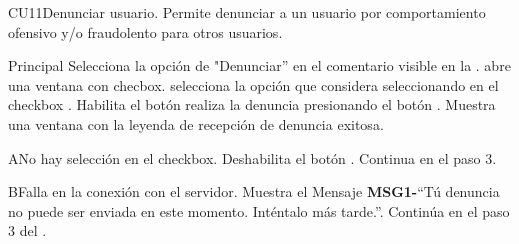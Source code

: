 \begin{UseCase}{CU11}{Denunciar usuario.}{
		Permite denunciar a un usuario por comportamiento ofensivo y/o fraudolento para otros usuarios.
	}
		
	\end{UseCase}

	\begin{UCtrayectoria}{Principal}
		\UCpaso[\UCactor] Selecciona la opción de "Denunciar'' en el comentario visible en la .
		\UCpaso abre una ventana con checbox.
		\UCpaso[\UCactor] selecciona la opción que considera seleccionando en el checkbox .
		\UCpaso Habilita el botón 
		\UCpaso[\UCactor] realiza la denuncia presionando el botón  .
		\UCpaso Muestra una ventana con la leyenda de recepción de denuncia exitosa.
	\end{UCtrayectoria}

		\begin{UCtrayectoriaA}{A}{No hay selección en el checkbox.}
			\UCpaso Deshabilita el botón .
			\UCpaso Continua en el paso 3.
		\end{UCtrayectoriaA}
		
		\begin{UCtrayectoriaA}{B}{Falla en la conexión con el servidor.}
			\UCpaso Muestra el Mensaje {\bf MSG1-}``Tú denuncia no puede ser enviada en este momento. Inténtalo más tarde.''.
			\UCpaso Continúa en el paso 3 del .
		\end{UCtrayectoriaA}
		
		
		
